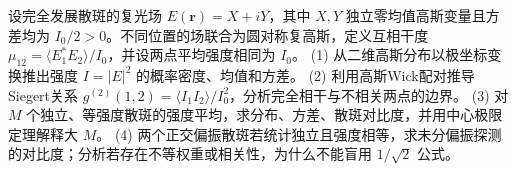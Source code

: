 设完全发展散斑的复光场 \(E(\boldsymbol r)=X+iY\)，其中 \(X,Y\) 独立零均值高斯变量且方差均为 \(I_0/2>0\)。不同位置的场联合为圆对称复高斯，定义互相干度 \(\mu_{12}=\langle E_1^*E_2\rangle/I_0\)，并设两点平均强度相同为 \(I_0\)。
(1) 从二维高斯分布以极坐标变换推出强度 \(I=|E|^2\) 的概率密度、均值和方差。
(2) 利用高斯Wick配对推导Siegert关系 \(g^{(2)}(1,2)=\langle I_1I_2\rangle/I_0^2\)，分析完全相干与不相关两点的边界。
(3) 对 \(M\) 个独立、等强度散斑的强度平均，求分布、方差、散斑对比度，并用中心极限定理解释大 \(M\)。
(4) 两个正交偏振散斑若统计独立且强度相等，求未分偏振探测的对比度；分析若存在不等权重或相关性，为什么不能盲用 \(1/\sqrt2\) 公式。
